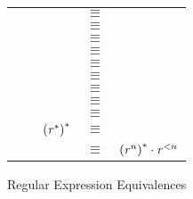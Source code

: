 \begin{figure}
\setcounter{rowcount}{0}
\centering
\begin{tabular}{@{\stepcounter{rowcount}\therowcount.\hspace*{\tabcolsep}}llrcl}
& & \Regex{} & $\equiv$ & \Regex{} \\
& & \RegexConcat{(\RegexConcat{\Regex{}}{\Regex'})}{\Regex''} & $\equiv$ & \RegexConcat{\Regex{}}{(\RegexConcat{\Regex'}{\Regex''})} \\
& & \RegexOr{(\RegexOr{\Regex}{\Regex'})}{\Regex''} & $\equiv$ & \RegexOr{\Regex}{(\RegexOr{\Regex'}{\Regex''})} \\
& & \RegexOr{\Regex{}}{\RegexAlt{}} & $\equiv$ & \RegexOr{\RegexAlt{}}{\Regex{}}\\
& & \RegexConcat{\Regex{}}{(\RegexOr{\Regex{}'}{\Regex{}''})} & $\equiv$ & \RegexOr{(\RegexConcat{\Regex{}}{\Regex{}'})}{(\RegexConcat{\Regex{}}{\Regex{}''})} \\
& & \RegexConcat{(\RegexOr{\Regex{}'}{\Regex{}''})}{\Regex{}} & $\equiv$ & \RegexOr{(\RegexConcat{\Regex{}'}{\Regex{}})}{(\RegexConcat{\Regex{}''}{\Regex{}})} \\
& & \RegexConcat{\Regex{}}{\EmptyString{}} & $\equiv$ & \Regex{}\\
& & \Star{(\RegexOr{\Regex{}}{\RegexAlt{}})} & $\equiv$ & \RegexConcat{\Star{(\RegexConcat{\Star{\Regex{}}}{\RegexAlt{}})}}{\Star{\Regex{}}}\\
& & \Star{\RegexConcat{\Regex{}}{\RegexAlt{}}} & $\equiv$ & \RegexOr{\EmptyString{}}{(\RegexConcat{\RegexConcat{\Regex{}}{\Star{(\RegexConcat{\RegexAlt{}}{\Regex{}})}}}{\RegexAlt{}})}\\
& & ${(\mathit{r}{}^*)}^*$ & $\equiv$ & \Star{\Regex{}}\\
& & \Star{\Regex{}} & $\equiv$ & ${(\mathit{r}{}^n)}^*\cdot\mathit{r}{}^{<n}$\\
\end{tabular}
\caption{Regular Expression Equivalences}
\label{fig:regex-equivalence-rules}
\end{figure}
